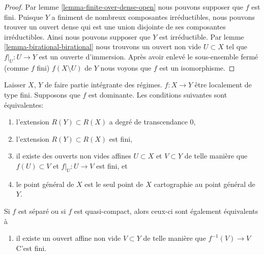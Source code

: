 \begin{proof}
Par lemme \ref{lemma-finite-over-dense-open} nous pouvons supposer que $f$ est fini. Puisque $Y$ a finiment de nombreux composantes irréductibles, nous pouvons trouver un ouvert dense qui est une union disjointe de ses composantes irréductibles. Ainsi nous pouvons supposer que $Y$ est irréductible. Par lemme \ref{lemma-birational-birational} nous trouvons un ouvert non vide $U \subset X$ tel que $f|_U : U \to Y$ est un ouverte d'immersion. Après avoir enlevé le sous-ensemble fermé (comme $f$ fini) $f(X \setminus U)$ de $Y$ nous voyons que $f$ est un isomorphisme.
\end{proof}

\begin{lemma}

\label{lemma-finite-degree}

Laisser $X$, $Y$ de faire partie intégrante des régimes. $f : X \to Y$ être localement de type fini. Supposons que $f$ est dominante. Les conditions suivantes sont équivalentes:

\begin{enumerate}

\item l'extension $R(Y) \subset R(X)$ a degré de transcendance $0$,
\item l'extension $R(Y) \subset R(X)$ est fini,
\item il existe des ouverts non vides affines $U \subset X$
et $V \subset Y$ de telle manière que $f(U) \subset V$
et $f|_U : U \to V$ est fini, et
\item le point général de $X$ est le seul point de $X$ cartographie au point général de $Y$.

\end{enumerate}

Si $f$ est séparé ou si $f$ est quasi-compact, alors ceux-ci sont également équivalents à

\begin{enumerate}

\item[(5)] il existe un ouvert affine non vide $V \subset Y$ de telle manière que $f^{-1}(V) \to V$ C'est fini.

\end{enumerate}

\end{lemma}

